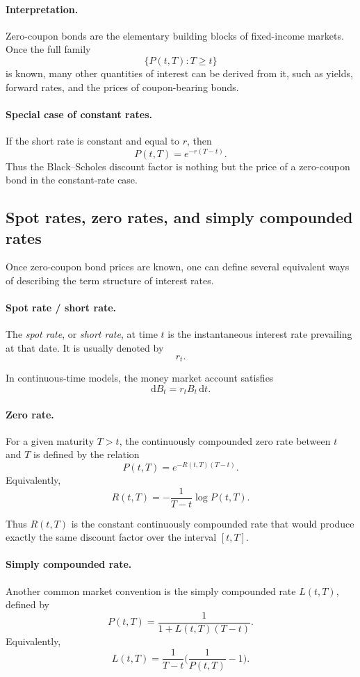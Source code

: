 \documentclass[11pt]{article}
\theoremstyle{plain}
\theoremstyle{definition}
\theoremstyle{remark}
\begin{document}
\paragraph{Interpretation.}
Zero-coupon bonds are the elementary building blocks of fixed-income
markets.
Once the full family
\[
\{P(t,T):T\ge t\}
\]
is known, many other quantities of interest can be derived from it, such
as yields, forward rates, and the prices of coupon-bearing bonds.

\paragraph{Special case of constant rates.}
If the short rate is constant and equal to \(r\), then
\[
P(t,T)=e^{-r(T-t)}.
\]
Thus the Black--Scholes discount factor is nothing but the price of a
zero-coupon bond in the constant-rate case.

\subsection{Spot rates, zero rates, and simply compounded rates}

Once zero-coupon bond prices are known, one can define several
equivalent ways of describing the term structure of interest rates.

\paragraph{Spot rate / short rate.}
The \emph{spot rate}, or \emph{short rate}, at time \(t\) is the
instantaneous interest rate prevailing at that date.
It is usually denoted by
\[
r_t.
\]

In continuous-time models, the money market account satisfies
\[
\mathrm{d}B_t=r_tB_t\,\mathrm{d}t.
\]

\paragraph{Zero rate.}
For a given maturity \(T>t\), the continuously compounded zero rate
between \(t\) and \(T\) is defined by the relation
\[
P(t,T)=e^{-R(t,T)(T-t)}.
\]
Equivalently,
\[
\boxed{
R(t,T)=-\frac{1}{T-t}\log P(t,T).
}
\]

Thus \(R(t,T)\) is the constant continuously compounded rate that would
produce exactly the same discount factor over the interval \([t,T]\).

\paragraph{Simply compounded rate.}
Another common market convention is the simply compounded rate
\(L(t,T)\), defined by
\[
P(t,T)=\frac{1}{1+L(t,T)(T-t)}.
\]
Equivalently,
\[
\boxed{
L(t,T)=\frac{1}{T-t}\Big(\frac{1}{P(t,T)}-1\Big).
}
\]
\end{document}

